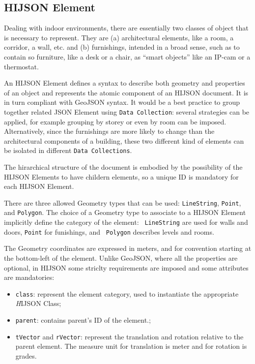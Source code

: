 \subsection{HIJSON Element}

Dealing with indoor environments, there are essentially two classes of object
that is necessary to represent. They are (a) architectural elements, like a
room, a corridor, a wall, etc. and (b) furnishings, intended in a broad sense,
such as to contain so furniture, like a desk or a chair, as ``smart objects''
like an IP-cam or a thermostat.

An HIJSON Element defines a syntax to describe both geometry and properties of
an object and represents the atomic component of an HIJSON document. It is in
turn compliant with GeoJSON syntax. It would be a best practice to group
together related JSON Element using {\tt Data Collection}: several strategies
can be applied, for example grouping by storey or even by room can be imposed.
Alternatively, since the furnishings are more likely to change than the
architectural components of a building, these two different kind of elements
can be isolated in different {\tt Data Collections}.


The hirarchical structure of the document is embodied by the possibility of the HIJSON Elements to have childern elements, so a unique ID is mandatory for each HIJSON Element. 

There are three allowed Geometry types that can be used: {\tt LineString},
{\tt Point}, and {\tt Polygon}. The choice of a Geometry type to associate to
a HIJSON Element implicitly define the category of the element: {\tt
LineString} are used for walls and doors, {\tt Point} for funishings, and {\tt
Polygon} describes levels and rooms.

The Geometry coordinates are expressed in meters, and for convention starting
at the bottom-left of the element. Unlike GeoJSON, where all the properties
are optional, in HIJSON some striclty requirements are imposed and some
attributes are mandatories:

\begin{itemize}
\itemsep1pt\parskip0pt
\item
 {\tt class}: represent the element category, used to instantiate
 the appropriate {\emph HIJSON Class};
\item
 {\tt parent}: contains parent's ID of the element.;
\item
 {\tt tVector} and {\tt rVector}: represent the translation and
 rotation relative to the parent element. The measure unit for
 translation is meter and for rotation is grades.
\end{itemize}

